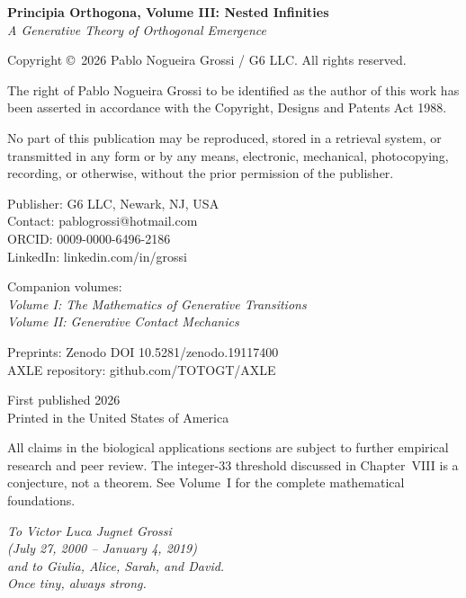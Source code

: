 \documentclass[12pt, oneside]{book}
\theoremstyle{plain}
\theoremstyle{definition}
\theoremstyle{remark}
\begin{document}
\thispagestyle{empty}
\vspace*{2cm}
{\small
\noindent\textbf{Principia Orthogona, Volume III: Nested Infinities}\\
\textit{A Generative Theory of Orthogonal Emergence}

\bigskip
\noindent Copyright \copyright\ 2026 Pablo Nogueira Grossi / G6 LLC.
All rights reserved.

\bigskip
\noindent The right of Pablo Nogueira Grossi to be identified as
the author of this work has been asserted in accordance with the
Copyright, Designs and Patents Act 1988.

\bigskip
\noindent No part of this publication may be reproduced, stored
in a retrieval system, or transmitted in any form or by any means,
electronic, mechanical, photocopying, recording, or otherwise,
without the prior permission of the publisher.

\bigskip
\noindent Publisher: G6 LLC, Newark, NJ, USA\\
Contact: pablogrossi@hotmail.com\\
ORCID: 0009-0000-6496-2186\\
LinkedIn: linkedin.com/in/grossi

\bigskip
\noindent Companion volumes:\\
\textit{Volume I: The Mathematics of Generative Transitions}\\
\textit{Volume II: Generative Contact Mechanics}

\bigskip
\noindent Preprints: Zenodo DOI 10.5281/zenodo.19117400\\
AXLE repository: github.com/TOTOGT/AXLE

\bigskip
\noindent First published 2026\\
Printed in the United States of America

\bigskip
{\footnotesize All claims in the biological applications
sections are subject to further empirical research and peer review.
The integer-33 threshold discussed in Chapter~VIII is a conjecture,
not a theorem. See Volume~I for the complete mathematical foundations.}
}
\cleardoublepage

\thispagestyle{empty}
\vspace*{6cm}
\begin{center}
\itshape
To Victor Luca Jugnet Grossi\\
(July 27, 2000 -- January 4, 2019)\\[1em]
and to Giulia, Alice, Sarah, and David.\\[1.5em]
\normalfont\small
\textit{Once tiny, always strong.}
\end{center}
\cleardoublepage
\end{document}
